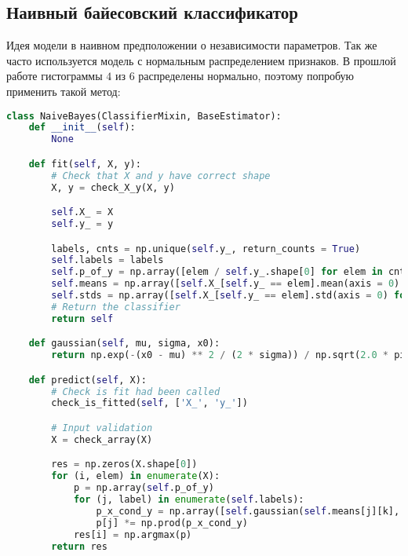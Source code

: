 \subsection{Наивный байесовский классификатор}
Идея модели в наивном предположении о независимости параметров. Так же часто используется модель с нормальным распределением признаков. В прошлой работе гистограммы $4$ из $6$ распределены нормально, поэтому попробую применить такой метод:
\begin{lstlisting}[language=Python]
class NaiveBayes(ClassifierMixin, BaseEstimator):
    def __init__(self):
        None

    def fit(self, X, y):
        # Check that X and y have correct shape
        X, y = check_X_y(X, y)

        self.X_ = X
        self.y_ = y

        labels, cnts = np.unique(self.y_, return_counts = True)
        self.labels = labels
        self.p_of_y = np.array([elem / self.y_.shape[0] for elem in cnts])
        self.means = np.array([self.X_[self.y_ == elem].mean(axis = 0) for elem in labels])
        self.stds = np.array([self.X_[self.y_ == elem].std(axis = 0) for elem in labels])
        # Return the classifier
        return self

    def gaussian(self, mu, sigma, x0):
        return np.exp(-(x0 - mu) ** 2 / (2 * sigma)) / np.sqrt(2.0 * pi * sigma)

    def predict(self, X):
        # Check is fit had been called
        check_is_fitted(self, ['X_', 'y_'])

        # Input validation
        X = check_array(X)

        res = np.zeros(X.shape[0])
        for (i, elem) in enumerate(X):
            p = np.array(self.p_of_y)
            for (j, label) in enumerate(self.labels):
                p_x_cond_y = np.array([self.gaussian(self.means[j][k], self.stds[j][k], elem[k]) for k in range(X.shape[1])])
                p[j] *= np.prod(p_x_cond_y)
            res[i] = np.argmax(p)
        return res
\end{lstlisting}
\pagebreak

